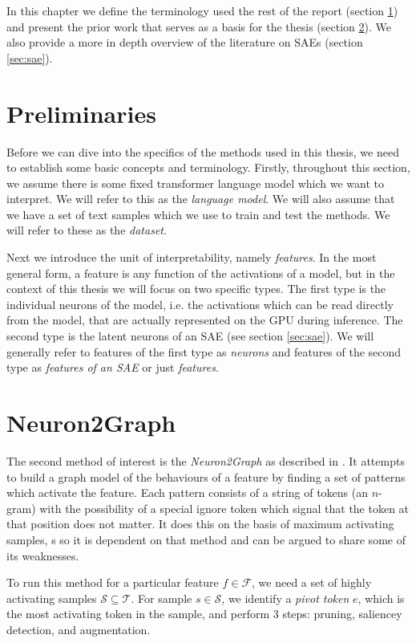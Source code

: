 In this chapter we define the terminology used the rest of the report (section \ref{sec:preliminaries}) and present the prior work that serves as a basis for the thesis (section \ref{sec:n2g}).
We also provide a more in depth overview of the literature on SAEs (section \ref{sec:sae}).

\section{Preliminaries}
\label{sec:preliminaries}
Before we can dive into the specifics of the methods used in this thesis, 
we need to establish some basic concepts and terminology.
Firstly, throughout this section, we assume there is some fixed 
transformer language model \parencite{vaswani_attention_2023} 
which we want to interpret.
We will refer to this as the \emph{language model}.
We will also assume that we have a set of text samples 
which we use to train and test the methods.
We will refer to these as the \emph{dataset}.

Next we introduce the unit of interpretability, namely \emph{features}. 
In the most general form, a feature is any function of the activations 
of a model, but in the context of this thesis we will focus on two 
specific types.
The first type is the individual neurons of the model, i.e. the activations which can be read directly from the model, that are actually represented on the GPU during inference.
The second type is the latent neurons of an SAE (see section \ref{sec:sae}).
We will generally refer to features of the first type as \emph{neurons} and features of the second type as \emph{features of an SAE} or just \emph{features}.

\section{Neuron2Graph}
\label{sec:n2g}
The second method of interest is the \emph{Neuron2Graph} 
as described in \cite{foote_neuron_2023}.
It attempts to build a graph model of the behaviours of a feature 
by finding a set of patterns which activate the feature.
Each pattern consists of a string of tokens (an $n$-gram) 
with the possibility of a special ignore token 
which signal that the token at that position does not matter.
It does this on the basis of maximum activating samples,
s 
so it is dependent on that method and 
can be argued to share some of its weaknesses.

To run this method for a particular feature $f\in\mathcal{F}$, 
we need a set of highly activating samples $\mathcal S\subseteq \mathcal T$.
For sample $s\in\mathcal S$, we identify a \emph{pivot token} $e$, 
which is the most activating token in the sample, 
and perform 3 steps: pruning, saliencey detection, and augmentation.

